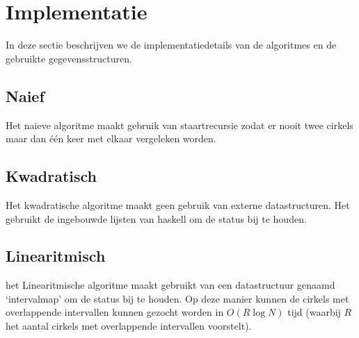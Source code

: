\section{Implementatie}
\label{sec:implementation}
In deze sectie beschrijven we de implementatiedetails van de algoritmes en de gebruikte gegevensstructuren.

\subsection{Naief}
Het naieve algoritme maakt gebruik van staartrecursie zodat er nooit twee cirkels maar dan \'e\'en keer met elkaar vergeleken worden.

\subsection{Kwadratisch}
Het kwadratische algoritme maakt geen gebruik van externe datastructuren. Het gebruikt de ingebouwde lijsten van haskell om de status bij te houden.


\subsection{Linearitmisch}
het Linearitmische algoritme maakt gebruikt van een datastructuur genaamd `intervalmap' om de status bij te houden.
Op deze manier kunnen de cirkels met overlappende intervallen kunnen gezocht worden in $O(R\log N)$ tijd (waarbij $R$ het aantal cirkels met overlappende intervallen voorstelt).